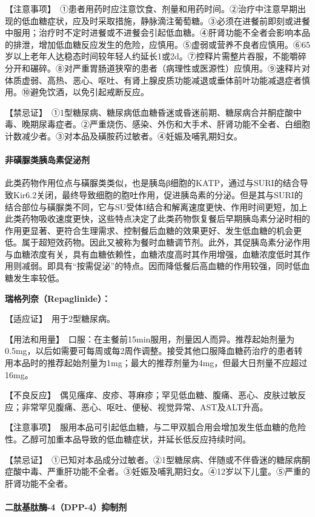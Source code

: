 【注意事项】　①患者用药时应注意饮食、剂量和用药时间。②治疗中注意早期出现的低血糖症状，应及时采取措施，静脉滴注葡萄糖。③必须在进餐前即刻或进餐中服用；治疗时不定时进餐或不进餐会引起低血糖。④肝肾功能不全者会影响本品的排泄，增加低血糖反应发生的危险，应慎用。⑤虚弱或营养不良者应慎用。⑥65岁以上老年人达稳态时间较年轻人约延长1或2d。⑦控释片需整片吞服，不能嚼碎分开和碾碎。⑧对严重胃肠道狭窄的患者（病理性或医源性）应慎用。⑨速释片对体质虚弱、高热、恶心、呕吐、有肾上腺皮质功能减退或垂体前叶功能减退症者慎用。⑩避免饮酒，以免引起戒断反应。

【禁忌证】　①1型糖尿病、糖尿病低血糖昏迷或昏迷前期、糖尿病合并酮症酸中毒、晚期尿毒症者。②严重烧伤、感染、外伤和大手术、肝肾功能不全者、白细胞计数减少者。③对本品及磺胺药过敏者。④妊娠及哺乳期妇女。
\paragraph{非磺脲类胰岛素促泌剂}

此类药物作用位点与磺脲类类似，也是胰岛β细胞的KATP，通过与SURI的结合导致Kir6.2关闭，最终导致细胞的胞吐作用，促进胰岛素的分泌。但是其与SURI的结合部位与磺脲类不同，它与SU受体I结合和解离速度更快、作用时间更短，加上此类药物吸收速度更快，这些特点决定了此类药物恢复餐后早期胰岛素分泌时相的作用更显著、更符合生理需求、控制餐后血糖的效果更好、发生低血糖的机会更低。属于超短效药物。因此又被称为餐时血糖调节剂。此外，其促胰岛素分泌作用与血糖浓度有关，具有血糖依赖性，血糖浓度高时其作用增强，血糖浓度低时其作用则减弱。即具有“按需促泌”的特点。因而降低餐后高血糖的作用较强，同时低血糖发生率较低。

\textbf{瑞格列奈（Repaglinide）：}

【适应证】　用于2型糖尿病。

【用法和用量】　口服：在主餐前15min服用，剂量因人而异。推荐起始剂量为0.5mg，以后如需要可每周或每2周作调整。接受其他口服降血糖药治疗的患者转用本品时的推荐起始剂量为1mg；最大的推荐剂量为4mg，但最大日剂量不应超过16mg。

【不良反应】　偶见瘙痒、皮疹、荨麻疹；罕见低血糖、腹痛、恶心、皮肤过敏反应；非常罕见腹痛、恶心、呕吐、便秘、视觉异常、AST及ALT升高。

【注意事项】　服用本品可引起低血糖，与二甲双胍合用会增加发生低血糖的危险性。乙醇可加重本品导致的低血糖症状，并延长低反应持续时间。

【禁忌证】　①已知对本品成分过敏者。②1型糖尿病、伴随或不伴昏迷的糖尿病酮症酸中毒、严重肝功能不全者。③妊娠及哺乳期妇女。④12岁以下儿童。⑤严重的肝肾功能不全者。
\paragraph{二肽基肽酶-4（DPP-4）抑制剂}

